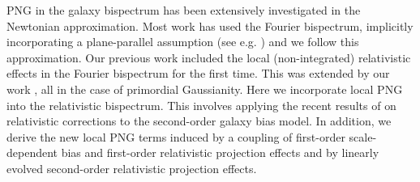 PNG in the galaxy bispectrum has been extensively investigated in the Newtonian approximation. Most work has used the Fourier bispectrum, implicitly incorporating a plane-parallel assumption (see e.g. 
\cite{Verde:1999ij,Scoccimarro:2003wn,Sefusatti:2006pa,Sefusatti:2007ih,Giannantonio:2009,Baldauf:2010vn,Tellarini:2015faa,Tellarini:2016sgp,Desjacques:2016bnm,Watkinson:2017zbs,Majumdar:2017tdm,Karagiannis:2018jdt,Yankelevich:2018uaz,Sarkar:2019ojl,Karagiannis:2019jjx,Bharadwaj:2020wkc,Karagiannis:2020dpq, MoradinezhadDizgah:2020whw}) and we follow this approximation.
Our previous work \cite{Umeh:2016nuh} included the local (non-integrated) relativistic effects in the Fourier bispectrum for the first time. This was extended by our work \cite{Jolicoeur:2017nyt, Jolicoeur:2017eyi, Jolicoeur:2018blf,Clarkson:2018dwn,Maartens:2019yhx,deWeerd:2019cae, Jolicoeur:2020eup, Umeh:2020cag}, all in the case of primordial Gaussianity. 
Here we incorporate local PNG into the relativistic bispectrum. This involves applying the recent results of \cite{Umeh:2019qyd, Umeh:2019jqg} on relativistic corrections to the second-order galaxy bias model. {In addition, we derive the new local  PNG terms induced by  a coupling of first-order scale-dependent bias and first-order relativistic projection effects and by linearly evolved second-order relativistic projection effects.}

